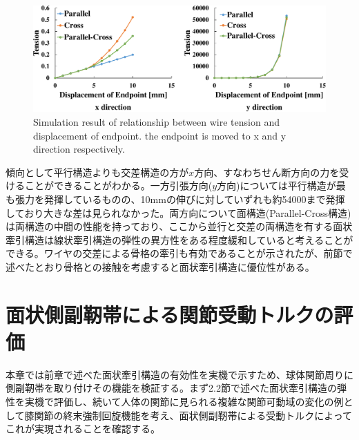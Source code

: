 \documentclass{jarticle}
\begin{document}
\begin{figure}[tb]
 \centering
  \includegraphics[width=1.15\columnwidth]{figs/xy.pdf}
  \vspace*{-4mm}
  \caption{Simulation result of relationship between wire tension and displacement of endpoint. the endpoint is moved to x and y direction respectively.}
  \label{fig:simulation}
\end{figure}
傾向として平行構造よりも交差構造の方が${x}$方向、すなわちせん断方向の力を受けることができることがわかる。一方引張方向(${y}$方向)については平行構造が最も張力を発揮しているものの、10mmの伸びに対していずれも約54000まで発揮しており大きな差は見られなかった。両方向について面構造(Parallel-Cross構造)は両構造の中間の性能を持っており、ここから並行と交差の両構造を有する面状牽引構造は線状牽引構造の弾性の異方性をある程度緩和していると考えることができる。ワイヤの交差による骨格の牽引も有効であることが示されたが、前節で述べたとおり骨格との接触を考慮すると面状牽引構造に優位性がある。

\section{面状側副靭帯による関節受動トルクの評価}
本章では前章で述べた面状牽引構造の有効性を実機で示すため、球体関節周りに側副靭帯を取り付けその機能を検証する。まず2.2節で述べた面状牽引構造の弾性を実機で評価し、続いて人体の関節に見られる複雑な関節可動域の変化の例として膝関節の終末強制回旋機能を考え、面状側副靭帯による受動トルクによってこれが実現されることを確認する。
\end{document}
